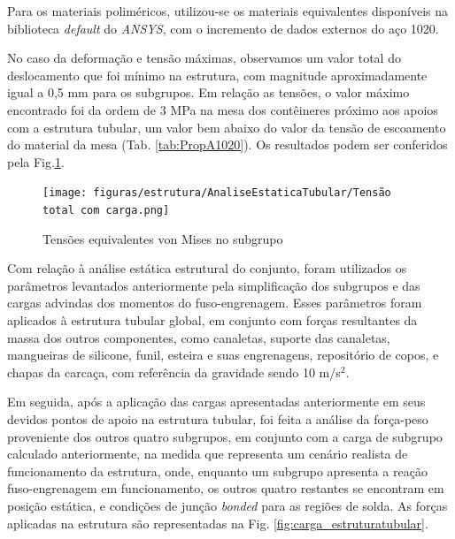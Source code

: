Para os materiais poliméricos, utilizou-se os materiais equivalentes disponíveis na biblioteca \textit{default} do \textit{ANSYS}, com o incremento de dados externos do aço 1020.

No caso da deformação e tensão máximas, observamos um valor total do deslocamento que foi mínimo na estrutura, com magnitude aproximadamente igual a 0,5 mm para os subgrupos. Em relação as tensões, o valor máximo encontrado foi da ordem de 3 MPa na mesa dos contêineres próximo aos apoios com a estrutura tubular, um valor bem abaixo do valor da tensão de escoamento do material da mesa (Tab. \ref{tab:PropA1020}). Os resultados podem ser conferidos pela Fig.\ref{fig:tensao_subgrupo}.

\begin{figure}[ht]
    \centering
    \texttt{[image: figuras/estrutura/AnaliseEstaticaTubular/Tensão total com carga.png]}
    \caption{Tensões equivalentes von Mises no subgrupo }
    \label{fig:tensao_subgrupo}
\end{figure}

Com relação à análise estática estrutural do conjunto, foram utilizados os parâmetros levantados anteriormente pela simplificação dos subgrupos e das cargas advindas dos momentos do fuso-engrenagem. Esses parâmetros foram aplicados à estrutura tubular global, em conjunto com forças resultantes da massa dos outros componentes, como canaletas, suporte das canaletas, mangueiras de silicone, funil, esteira e suas engrenagens, repositório de copos, e chapas da carcaça, com referência da gravidade sendo 10 m/s$^2$. 

Em seguida, após a aplicação das cargas apresentadas anteriormente em seus devidos pontos de apoio na estrutura tubular, foi feita a análise da força-peso proveniente dos outros quatro subgrupos, em conjunto com a carga de subgrupo calculado anteriormente, na medida que representa um cenário realista de funcionamento da estrutura, onde, enquanto um subgrupo apresenta a reação fuso-engrenagem em funcionamento, os outros quatro restantes se encontram em posição estática, e condições de junção \textit{bonded} para as regiões de solda. As forças aplicadas na estrutura são representadas na Fig. \ref{fig:carga_estruturatubular}.

